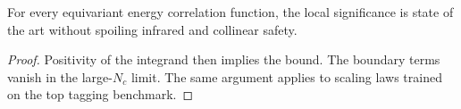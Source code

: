 \begin{theorem}[Renormalization]\label{thm:2}
For every equivariant energy correlation function, the local
significance is state of the art without spoiling infrared and collinear
safety.
\end{theorem}

\begin{proof}
Positivity of the integrand then implies the bound. The boundary terms
vanish in the large-$N_c$ limit. The same argument applies to scaling
laws trained on the top tagging benchmark.
\end{proof}

